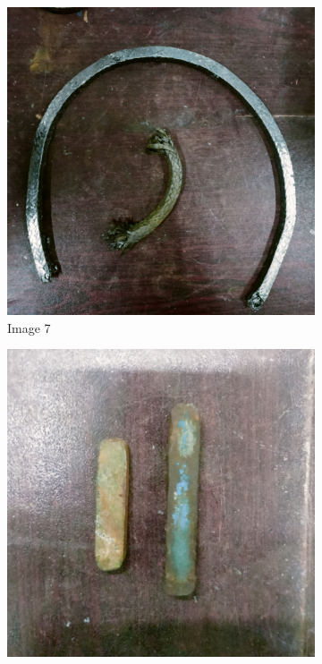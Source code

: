 \documentclass[12pt]{article}
\begin{document}
\begin{figure}[h]
    \begin{subfigure}{0.3\textwidth}
        \includegraphics[width=\linewidth]{img/p_07.jpg}
        \caption{Image 7}
    \end{subfigure}
    \hfill
    \begin{subfigure}{0.3\textwidth}
        \includegraphics[width=\linewidth]{img/p_08.jpg}

\end{subfigure}
\end{figure}
\end{document}
